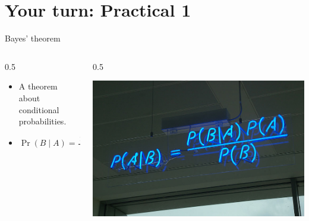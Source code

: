 \documentclass[
  ignorenonframetext,
  aspectratio=169]{beamer}
\def\begincols{\begin{columns}[c]}
\def\endcols{\end{columns}}
\def\begincol{\begin{column}{0.5\textwidth}}
\def\endcol{\end{column}}
\begin{document}
\hypertarget{your-turn-practical-1}{%
\section{Your turn: Practical 1}\label{your-turn-practical-1}}

\begin{frame}{Bayes' theorem}
\protect\hypertarget{bayes-theorem}{}
\begincols
\begincol

\begin{itemize}
\item
  A theorem about conditional probabilities.
\item
  \(\Pr(B \mid A) = \displaystyle{\frac{ \Pr(A \mid B) \; \Pr(B)}{\Pr(A)}}\)
\end{itemize}

\endcol

\begincol

\includegraphics{img/bayes_neon.jpeg}

\endcol
\endcols
\end{frame}
\end{document}
